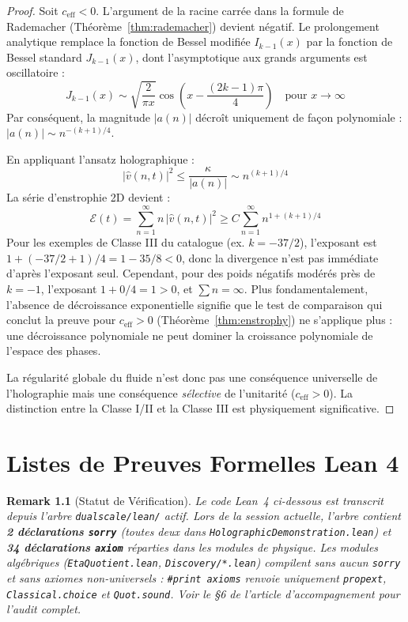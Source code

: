 \documentclass[11pt,twoside,openright]{book}
\newtheorem{remark}{Remark}[chapter]
\begin{document}
\begin{proof}
Soit $c_{\text{eff}} < 0$. L'argument de la racine carrée dans la formule de Rademacher (Théorème~\ref{thm:rademacher}) devient négatif. Le prolongement analytique remplace la fonction de Bessel modifiée $I_{k-1}(x)$ par la fonction de Bessel standard $J_{k-1}(x)$, dont l'asymptotique aux grands arguments est oscillatoire :
\[ J_{k-1}(x) \sim \sqrt{\frac{2}{\pi x}} \cos\!\left(x - \frac{(2k-1)\pi}{4}\right) \quad \text{pour } x \to \infty \]
Par conséquent, la magnitude $|a(n)|$ décroît uniquement de façon polynomiale : $|a(n)| \sim n^{-(k+1)/4}$.

En appliquant l'ansatz holographique :
\[ |\hat{v}(n, t)|^2 \le \frac{\kappa}{|a(n)|} \sim n^{(k+1)/4} \]
La série d'enstrophie 2D devient :
\[ \mathcal{E}(t) = \sum_{n=1}^{\infty} n\, |\hat{v}(n,t)|^2 \ge C \sum_{n=1}^{\infty} n^{1 + (k+1)/4} \]
Pour les exemples de Classe III du catalogue (ex. $k = -37/2$), l'exposant est $1 + (-37/2 + 1)/4 = 1 - 35/8 < 0$, donc la divergence n'est pas immédiate d'après l'exposant seul. Cependant, pour des poids négatifs modérés près de $k = -1$, l'exposant $1 + 0/4 = 1 > 0$, et $\sum n = \infty$. Plus fondamentalement, l'absence de décroissance exponentielle signifie que le test de comparaison qui conclut la preuve pour $c_{\text{eff}} > 0$ (Théorème~\ref{thm:enstrophy}) ne s'applique plus : une décroissance polynomiale ne peut dominer la croissance polynomiale de l'espace des phases.

La régularité globale du fluide n'est donc pas une conséquence universelle de l'holographie mais une conséquence \emph{sélective} de l'unitarité ($c_{\text{eff}} > 0$). La distinction entre la Classe I/II et la Classe III est physiquement significative.
\end{proof}

\appendix
\chapter{Listes de Preuves Formelles Lean 4}

\begin{remark}[Statut de Vérification]
Le code Lean~4 ci-dessous est transcrit depuis l'arbre \texttt{dualscale/lean/} actif. Lors de la session actuelle, l'arbre contient \textbf{2 déclarations \texttt{sorry}} (toutes deux dans \texttt{HolographicDemonstration.lean}) et \textbf{34 déclarations \texttt{axiom}} réparties dans les modules de physique. Les modules algébriques (\texttt{EtaQuotient.lean}, \texttt{Discovery/*.lean}) compilent sans aucun \texttt{sorry} et sans axiomes non-universels : \texttt{\#print axioms} renvoie uniquement \texttt{propext}, \texttt{Classical.choice} et \texttt{Quot.sound}. Voir le §6 de l'article d'accompagnement pour l'audit complet.
\end{remark}
\end{document}
